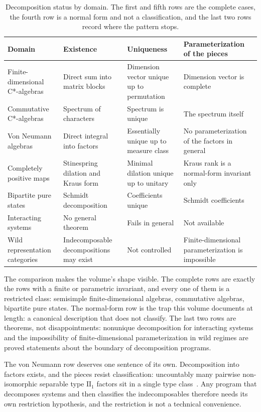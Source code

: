 \documentclass[11pt,letterpaper]{article}
\theoremstyle{definition}
\theoremstyle{remark}
\begin{document}
\begin{table}[ht]
\centering
\small
\begin{tabularx}{\textwidth}{@{}L{0.2\textwidth}L{0.22\textwidth}L{0.2\textwidth}X@{}}
\toprule
Domain & Existence & Uniqueness & Parameterization of the pieces \\
\midrule
Finite-dimensional C*-algebras & Direct sum into matrix blocks & Dimension vector unique up to permutation & Dimension vector is complete \\
Commutative C*-algebras & Spectrum of characters & Spectrum is unique & The spectrum itself \\
Von Neumann algebras & Direct integral into factors & Essentially unique up to measure class & No parameterization of the factors in general \\
Completely positive maps & Stinespring dilation and Kraus form & Minimal dilation unique up to unitary & Kraus rank is a normal-form invariant only \\
Bipartite pure states & Schmidt decomposition & Coefficients unique & Schmidt coefficients \\
Interacting systems & No general theorem & Fails in general & Not available \\
Wild representation categories & Indecomposable decompositions may exist & Not controlled & Finite-dimensional parameterization is impossible \\
\bottomrule
\end{tabularx}
\caption{Decomposition status by domain. The first and fifth rows are the complete cases, the fourth row is a normal form and not a classification, and the last two rows record where the pattern stops.}
\label{tab:domains}
\end{table}

The comparison makes the volume's shape visible. The complete rows are exactly the rows with a finite or parametric invariant, and every one of them is a restricted class: semisimple finite-dimensional algebras, commutative algebras, bipartite pure states. The normal-form row is the trap this volume documents at length: a canonical description that does not classify. The last two rows are theorems, not disappointments: nonunique decomposition for interacting systems and the impossibility of finite-dimensional parameterization in wild regimes are proved statements about the boundary of decomposition programs.

The von Neumann row deserves one sentence of its own. Decomposition into factors exists, and the pieces resist classification: uncountably many pairwise non-isomorphic separable type $\mathrm{II}_1$ factors sit in a single type class~\cite{mcduff}. Any program that decomposes systems and then classifies the indecomposables therefore needs its own restriction hypothesis, and the restriction is not a technical convenience.
\end{document}
